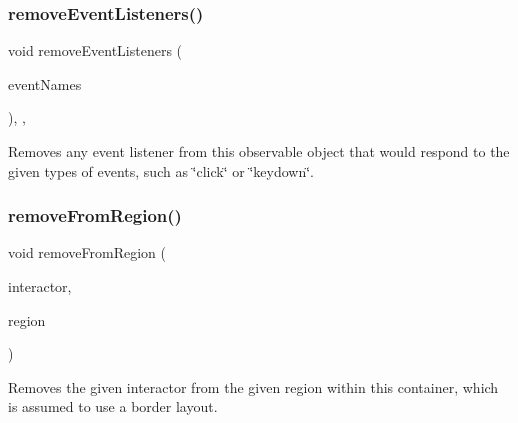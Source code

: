 \mbox{\label{classGObservable_af51cc35c29a1bd1908609d432decdbb6}} 
\subsubsection{\texorpdfstring{remove\+Event\+Listeners()}{removeEventListeners()}}
{\footnotesize\ttfamily void remove\+Event\+Listeners (\begin{DoxyParamCaption}\item[{std\+::initializer\+\_\+list$<$ std\+::string $>$}]{event\+Names }\end{DoxyParamCaption})\hspace{0.3cm}{\ttfamily [protected]}, {\ttfamily [virtual]}, {\ttfamily [inherited]}}



Removes any event listener from this observable object that would respond to the given types of events, such as \char`\"{}click\char`\"{} or \char`\"{}keydown\char`\"{}. 

\mbox{\label{classGContainer_a87a74b040025878283ba685e30d5104f}} 
\subsubsection{\texorpdfstring{remove\+From\+Region()}{removeFromRegion()}\hspace{0.1cm}{\footnotesize\ttfamily [1/6]}}
{\footnotesize\ttfamily void remove\+From\+Region (\begin{DoxyParamCaption}\item[{\mbox{\hyperlink{classGInteractor}{G\+Interactor}} $\ast$}]{interactor,  }\item[{\mbox{\hyperlink{classGContainer_a81a01a86de31071a92e6cce0bab9bc4b}{Region}}}]{region }\end{DoxyParamCaption})\hspace{0.3cm}{\ttfamily [virtual]}}



Removes the given interactor from the given region within this container, which is assumed to use a border layout. 

